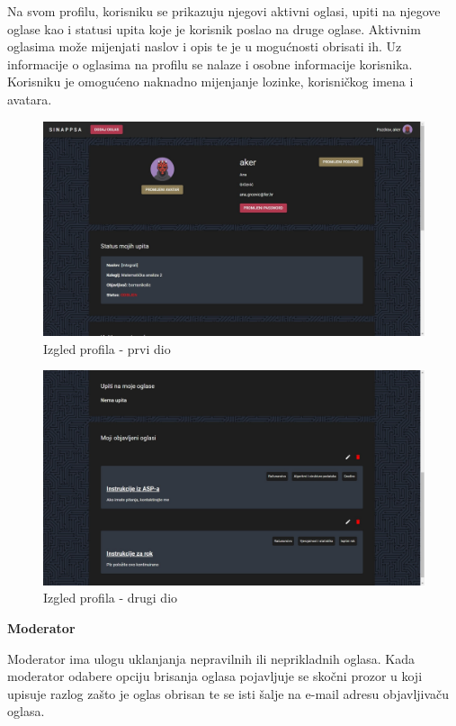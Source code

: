 			Na svom profilu, korisniku se prikazuju njegovi aktivni oglasi, upiti na njegove oglase kao i statusi upita koje je korisnik poslao na druge oglase. Aktivnim oglasima može mijenjati naslov i opis te je u mogućnosti obrisati ih. Uz informacije o oglasima na profilu se nalaze i osobne informacije korisnika. Korisniku je omogućeno naknadno mijenjanje lozinke, korisničkog imena i avatara.
			
			\begin{figure}[H]
				\includegraphics[scale=0.37]{slike/profil1.jpg} 
				\centering
				\caption{Izgled profila - prvi dio}
				\label{fig:profil1}
			\end{figure}
		
			\begin{figure}[H]
				\includegraphics[scale=0.37]{slike/profil2.jpg} 
				\centering
				\caption{Izgled profila - drugi dio}
				\label{fig:profil2}
			\end{figure}
		
	\noindent \textbf{Moderator}
	
			Moderator ima ulogu uklanjanja nepravilnih ili neprikladnih oglasa. Kada moderator odabere opciju brisanja oglasa pojavljuje se skočni prozor u koji upisuje razlog zašto je oglas obrisan te se isti šalje na e-mail adresu objavljivaču oglasa. 
			
